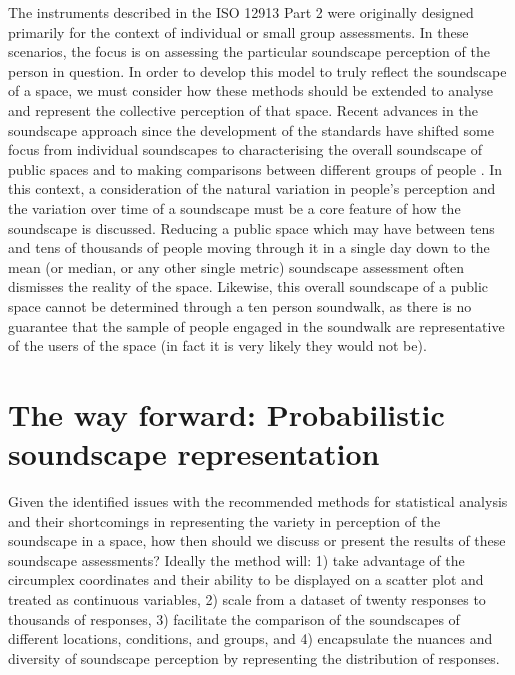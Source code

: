 The instruments described in the ISO 12913 Part 2 \citep{ISO12913Part2} were originally designed primarily for the context of individual or small group assessments. In these scenarios, the focus is on assessing the particular soundscape perception of the person in question. In order to develop this model to truly reflect the soundscape of a space, we must consider how these methods should be extended to analyse and represent the collective perception of that space. Recent advances in the soundscape approach since the development of the standards have shifted some focus from individual soundscapes to characterising the overall soundscape of public spaces \citep{Mitchell2020Soundscape} and to making comparisons between different groups of people \citep{Jeon2018cross}. In this context, a consideration of the natural variation in people's perception and the variation over time of a soundscape must be a core feature of how the soundscape is discussed. Reducing a public space which may have between tens and tens of thousands of people moving through it in a single day down to the mean (or median, or any other single metric) soundscape assessment often dismisses the reality of the space. Likewise, this overall soundscape of a public space cannot be determined through a ten person soundwalk, as there is no guarantee that the sample of people engaged in the soundwalk are representative of the users of the space (in fact it is very likely they would not be).

\section{The way forward: Probabilistic soundscape representation}
Given the identified issues with the recommended methods for statistical analysis and their shortcomings in representing the variety in perception of the soundscape in a space, how then should we discuss or present the results of these soundscape assessments? Ideally the method will: 1) take advantage of the circumplex coordinates and their ability to be displayed on a scatter plot and treated as continuous variables, 2) scale from a dataset of twenty responses to thousands of responses, 3) facilitate the comparison of the soundscapes of different locations, conditions, and groups, and 4) encapsulate the nuances and diversity of soundscape perception by representing the distribution of responses.

